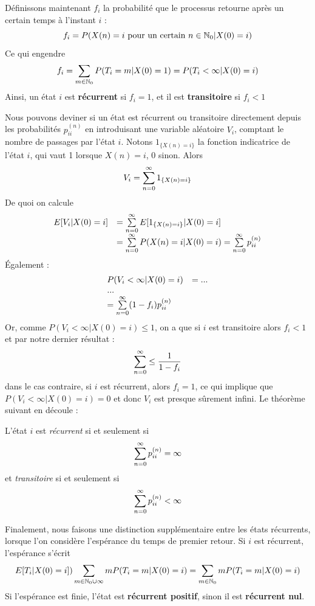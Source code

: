 \documentclass[11pt,a4paper]{article}
\numberwithin{equation}{section}
\begin{document}
Définissons maintenant $f_i$ la probabilité que le processus retourne après un certain temps à l'instant $i$ :
\begin{equation}
    f_i = P(X(n) = i\ \text{pour un certain } n \in\mathbb{N}_0 | X(0) = i)
\end{equation}
Ce qui engendre
\[f_i = \sum_{m \in \mathbb{N}_0} P(T_i = m | X(0) = 1) = P(T_i < \infty | X(0) = i)\]
Ainsi, un état $i$ est \textbf{récurrent} si $f_i = 1$, et il est \textbf{transitoire} si $f_i < 1$

Nous pouvons deviner si un état est récurrent ou transitoire directement depuis les probabilités $p^{(n)}_{ii}$ en introduisant une variable aléatoire $V_i$, comptant le nombre de passages par l'état $i$. Notons $1_{\{X(n)=i\}}$ la fonction indicatrice de l'état $i$, qui vaut 1 lorsque $X(n) = i$, 0 sinon. Alors
\begin{equation}
    V_i = \sum\limits_{n=0}^{\infty} 1_{\{X(n)=i\}}
\end{equation}
De quoi on calcule
\[\begin{array}{ll}
    E[V_i | X(0) = i] &= \sum\limits_{n=0}^{\infty}E[1_{\{X(n)=i\}} | X(0) = i]\\
                        &= \sum\limits_{n=0}^{\infty}P(X(n) = i | X(0) = i) = \sum\limits_{n=0}^{\infty} p^{(n)}_{ii}
\end{array}\]
Également :
\[\begin{array}{ll}
    P(V_i < \infty | X(0) = i) &= ...\\
    ...\\
    = \sum\limits_{n=0}^{\infty}(1-f_i)p^{(n)}_{ii}
\end{array}\]
Or, comme $P(V_i < \infty | X(0) = i) \leq 1$, on a que si $i$ est transitoire alors $f_i < 1$ et par notre dernier résultat :
\[\sum\limits_{n=0}^{\infty} \leq \frac{1}{1-f_i}\]
dans le cas contraire, si $i$ est récurrent, alors $f_i = 1$, ce qui implique que $P(V_i < \infty | X(0) = i) = 0$ et donc $V_i$ est presque sûrement infini. Le théorème suivant en découle :

\begin{boite}[0.7]
     L'état $i$ est \textit{récurrent} si et seulement si
     \[\sum\limits_{n=0}^{\infty}p^{(n)}_{ii} = \infty\]
     et \textit{transitoire} si et seulement si 
     \[\sum\limits_{n=0}^{\infty}p^{(n)}_{ii} < \infty\]     
\end{boite}

Finalement, nous faisons une distinction supplémentaire entre les états récurrents, lorsque l'on considère l'espérance du temps de premier retour. Si $i$ est récurrent, l'espérance s'écrit
\[E[T_i | X(0) = i] ) \sum_{m \in \mathbb{N}_0 \cup \infty} m P(T_i = m | X(0) = i) = \sum_{m \in \mathbb{N}_0} m P(T_i = m| X(0) =i)\]
Si l'espérance est finie, l'état est \textbf{récurrent positif}, sinon il est \textbf{récurrent nul}.
\end{document}
